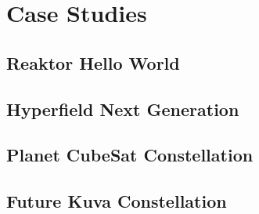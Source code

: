 \chapter{Case Studies}

\section{Reaktor Hello World}

\section{Hyperfield Next Generation}

\section{Planet CubeSat Constellation}

\section{Future Kuva Constellation}